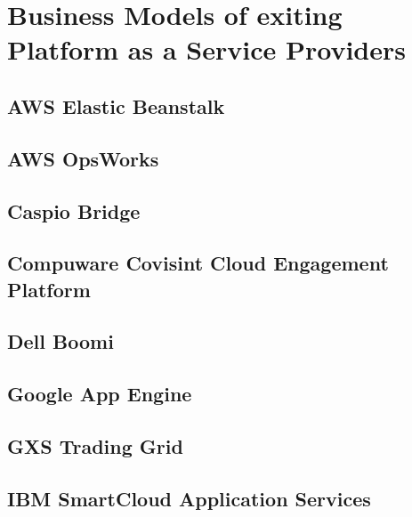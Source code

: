 \chapter{Business Models of exiting Platform as a Service Providers}\label{ch:app01}

\section{AWS Elastic Beanstalk}


\newpage
\section{AWS OpsWorks}


\section{Caspio Bridge}


\newpage
\section{Compuware Covisint Cloud Engagement Platform}


\newpage
\section{Dell Boomi}


\section{Google App Engine}


\newpage
\section{GXS Trading Grid}\label{ch:app01:gxs}


\newpage
\section{IBM SmartCloud Application Services}


